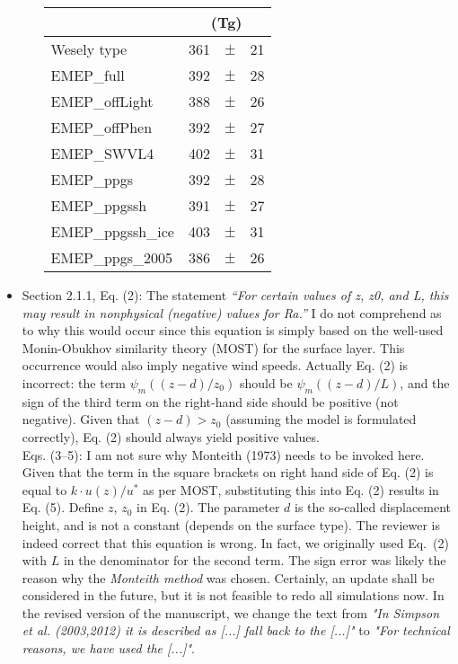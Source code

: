 \begin{itemize}
\begin{itemize}
\begin{table*}[h]
\begin{tabular}{lrcl}
          &  \multicolumn{3}{c}{(Tg)}\\
          \hline
          Wesely type & 361 & $\pm$ & 21\\
          EMEP\_full & 392 & $\pm$ & 28\\
          EMEP\_offLight & 388 & $\pm$ & 26\\
          EMEP\_offPhen & 392 & $\pm$ & 27\\
          EMEP\_SWVL4 & 402 & $\pm$ & 31\\
          EMEP\_ppgs & 392 & $\pm$ & 28\\
          EMEP\_ppgssh & 391 & $\pm$ & 27\\
          EMEP\_ppgssh\_ice & 403 & $\pm$ & 31\\
          EMEP\_ppgs\_2005 & 386 & $\pm$ & 26\\
          \hline
        \end{tabular}
        \label{tab:trop_ozone_burden}
    \end{table*}
  \end{itemize}
  
\item {\color{blue}  Section 2.1.1, Eq. (2): The statement \emph{“For certain values of z, z0, and L, this
    may result in nonphysical (negative) values for Ra.”} I do not comprehend as to why
  this would occur since this equation is simply based on the well-used Monin-Obukhov
  similarity theory (MOST) for the surface layer. This occurrence would also imply negative wind speeds.
  Actually Eq. (2) is incorrect: the term $\psi_m((z-d)/z_0)$ should be
  $\psi_m((z-d)/L)$, and the sign of the third term on the right-hand side should be positive
  (not negative). Given that $(z-d) > z_0$ (assuming the model is formulated correctly), Eq. (2) should always yield positive values.\\
  Eqs. (3--5): I am not sure why Monteith (1973) needs to be invoked here. Given that
  the term in the square brackets on right hand side of Eq. (2) is equal to $k\cdot u(z)/u^{*}$ as per
  MOST, substituting this into Eq. (2) results in Eq. (5).
  Define $z$, $z_0$ in Eq. (2). The parameter $d$ is the so-called displacement height, and is
  not a constant (depends on the surface type).}
  The reviewer is indeed correct that this equation is wrong. In fact, we originally
  used Eq.~(2) with $L$ in the denominator for the second term. The sign error was likely the reason why the \emph{Monteith method}
  was chosen. Certainly, an update shall be considered in the future, but it is not feasible to
  redo all simulations now. In the revised version of the manuscript, we change the text from \emph{"In Simpson et al.
  (2003,2012) it is described as [...] fall back to the [...]"} to \emph{"For technical reasons, we
have used the [...]"}.


\end{itemize}
